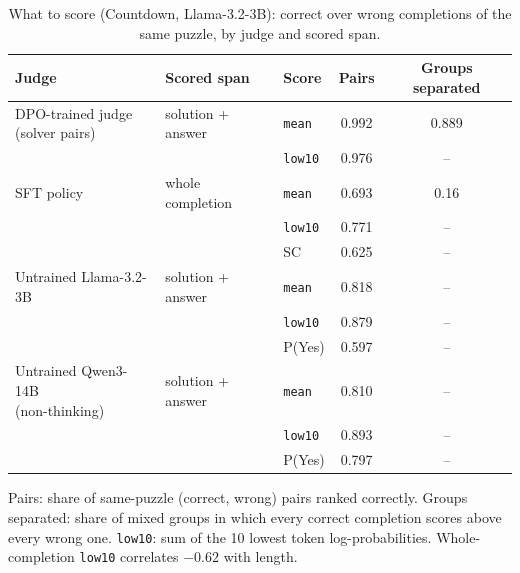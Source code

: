 \begin{table}[H]
\centering
\caption{What to score (Countdown, Llama-3.2-3B): correct over wrong completions of the same puzzle, by judge and scored span.}
\label{tab:scope}
\begin{threeparttable}
\begin{tabular}{lllcc}
\toprule
Judge & Scored span & Score & Pairs & Groups separated \\
\midrule
\makecell[l]{DPO-trained judge\\ (solver pairs)} & solution + answer & \texttt{mean} & 0.992 & 0.889 \\
 & & \texttt{low10} & 0.976 & -- \\
\addlinespace
SFT policy & whole completion & \texttt{mean} & 0.693 & 0.16 \\
 & & \texttt{low10} & 0.771 & -- \\
 & & SC & 0.625 & -- \\
\addlinespace
Untrained Llama-3.2-3B & solution + answer & \texttt{mean} & 0.818 & -- \\
 & & \texttt{low10} & 0.879 & -- \\
 & & P(Yes) & 0.597 & -- \\
\addlinespace
\makecell[l]{Untrained Qwen3-14B\\ (non-thinking)} & solution + answer & \texttt{mean} & 0.810 & -- \\
 & & \texttt{low10} & 0.893 & -- \\
 & & P(Yes) & 0.797 & -- \\
\bottomrule
\end{tabular}
\begin{tablenotes}\footnotesize
\item Pairs: share of same-puzzle (correct, wrong) pairs ranked correctly. Groups separated: share of mixed groups in which every correct completion scores above every wrong one. \texttt{low10}: sum of the 10 lowest token log-probabilities. Whole-completion \texttt{low10} correlates $-0.62$ with length.
\end{tablenotes}
\end{threeparttable}
\end{table}
